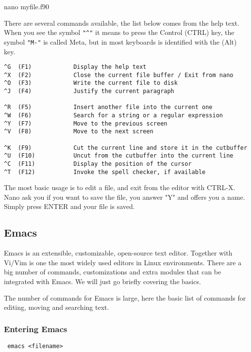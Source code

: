   nano myfile.f90

There are several commands available, the list below comes from the help text.
When you see the symbol \verb|"^"| it means to press the Control (CTRL) key, the symbol
\verb|"M-"| is called Meta, but in most keyboards is identified with the (Alt) key. 

\begin{lstlisting}
^G	(F1)            Display the help text
^X	(F2)            Close the current file buffer / Exit from nano
^O	(F3)            Write the current file to disk
^J	(F4)            Justify the current paragraph

^R	(F5)            Insert another file into the current one
^W	(F6)            Search for a string or a regular expression
^Y	(F7)            Move to the previous screen
^V	(F8)            Move to the next screen

^K	(F9)            Cut the current line and store it in the cutbuffer
^U	(F10)           Uncut from the cutbuffer into the current line
^C	(F11)           Display the position of the cursor
^T	(F12)           Invoke the spell checker, if available
\end{lstlisting}

The most basic usage is to edit a file, and exit from the editor with CTRL-X.
Nano ask you if you want to save the file, you answer "Y" and offers you a name.
Simply press ENTER and your file is saved.

\subsection{Emacs}

Emacs is an extensible, customizable, open-source text editor. Together with Vi/Vim is one the most widely
used editors in Linux environments. There are a big number of commands, customizations and extra modules 
that can be integrated with Emacs. We will just go briefly covering the basics.

The number of commands for Emacs is large, here the basic list of commands for editing, moving and searching text.

\subsubsection{Entering Emacs}

\begin{lstlisting}
 emacs <filename>
\end{lstlisting}

